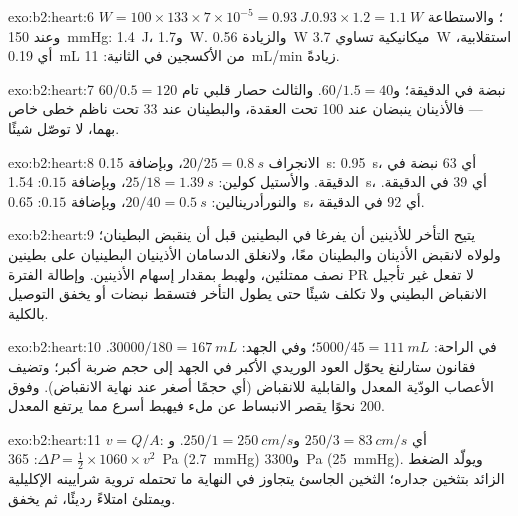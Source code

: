 \begin{solution}{exo:b2:heart:6}
$W = 100\times 133\times 7\times 10^{-5} = \qty{0.93}{J}$؛ والاستطاعة
$0.93\times 1.2 = \qty{1.1}{W}$. وعند \qty{150}{mmHg}: \qty{1.4}{J}،
و\qty{1.7}{W}. والزيادة \qty{0.56}{W} ميكانيكية تساوي \qty{3.7}{W}
استقلابية، أي \qty{0.19}{mL} من الأكسجين في الثانية: \qty{11}{mL/min} زيادةً.
\end{solution}

\begin{solution}{exo:b2:heart:7}
$60/0.5 = 120$ نبضة في الدقيقة؛ و$60/1.5 = 40$. والثالث حصار
قلبي تام --- فالأذينان ينبضان عند 100 تحت العقدة، والبطينان عند 33
تحت ناظم خطى خاص بهما،  لا توصّل شيئًا.
\end{solution}

\begin{solution}{exo:b2:heart:8}
الانجراف $20/25 = \qty{0.8}{s}$، وبإضافة \qty{0.15}{s}: \qty{0.95}{s}، أي 63
نبضة في الدقيقة. والأستيل كولين: $25/18 = \qty{1.39}{s}$، وبإضافة $0.15$:
\qty{1.54}{s}، أي 39 في الدقيقة. والنورأدرينالين: $20/40 = \qty{0.5}{s}$،
وبإضافة $0.15$: \qty{0.65}{s}، أي 92 في الدقيقة.
\end{solution}

\begin{solution}{exo:b2:heart:9}
يتيح التأخر للأذينين أن يفرغا في البطينين قبل أن
ينقبض البطينان؛ ولولاه لانقبض الأذينان والبطينان معًا،
ولانغلق الدسامان الأذينيان البطينيان على بطينين نصف
ممتلئين، ولهبط  بمقدار إسهام الأذينين.
وإطالة الفترة PR لا تفعل غير تأجيل الانقباض البطيني
ولا تكلف شيئًا حتى يطول التأخر فتسقط نبضات أو
يخفق التوصيل بالكلية.
\end{solution}

\begin{solution}{exo:b2:heart:10}
في الراحة: $5000/45 = \qty{111}{mL}$؛ وفي الجهد: $\num{30000}/180 =
\qty{167}{mL}$. فقانون ستارلنغ يحوّل العود الوريدي الأكبر
في الجهد إلى حجم ضربة أكبر؛ وتضيف الأعصاب الودّية المعدل
والقابلية للانقباض (أي حجمًا أصغر عند نهاية الانقباض). وفوق 200
نحوًا يقصر الانبساط عن ملء  فيهبط  أسرع مما يرتفع المعدل.
\end{solution}

\begin{solution}{exo:b2:heart:11}
$v = Q/A$: أي $250/3 = \qty{83}{cm/s}$ و$250/1 = \qty{250}{cm/s}$.
و$\Delta P = \tfrac12\times 1060\times v^{2}$: \qty{365}{Pa}
(\qty{2.7}{mmHg}) و\qty{3300}{Pa} (\qty{25}{mmHg}). ويولّد 
الضغط الزائد بتثخين جداره؛  الثخين الجاسئ يتجاوز
في النهاية ما تحتمله تروية شرايينه الإكليلية ويمتلئ
امتلاءً رديئًا، ثم يخفق.
\end{solution}

